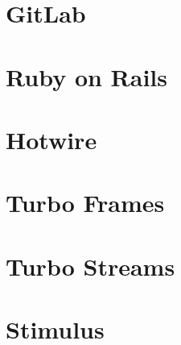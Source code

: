 \section{GitLab}
\section{Ruby on Rails}
\section{Hotwire}
\section{Turbo Frames}
\section{Turbo Streams}
\section{Stimulus}